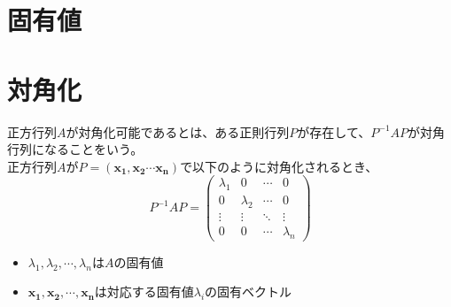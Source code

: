 \documentclass{jlreq}
\begin{document}
\section{固有値}


\section{対角化}
\begin{tcolorbox}[enhanced,title=定義1 行列の対角化, 
  attach boxed title to top left, 
  colback=white!95!blue,
  colbacktitle=white!10!blue!50!black,
  drop fuzzy shadow,
  boxrule=0.25mm,
  ]
  正方行列$A$が対角化可能であるとは、ある正則行列$P$が存在して、$P^{-1}AP$が対角行列になることをいう。 \\
  正方行列$A$が$P = (\boldsymbol{x_1}, \boldsymbol{x_2} \cdots \boldsymbol{x_n})$で以下のように対角化されるとき、
  \begin{equation*}
    P^{-1}AP = \begin{pmatrix}
      \lambda_1 & 0 & \cdots & 0 \\
      0 & \lambda_2 & \cdots & 0 \\
      \vdots & \vdots & \ddots & \vdots \\
      0 & 0 & \cdots & \lambda_n
  \end{pmatrix}
  \end{equation*}
  \begin{itemize}
    \item $\lambda_1, \lambda_2, \cdots, \lambda_n$は$A$の固有値
    \item $\boldsymbol{x_1}, \boldsymbol{x_2}, \cdots, \boldsymbol{x_n}$は対応する固有値$\lambda_i$の固有ベクトル
  \end{itemize}
\end{tcolorbox}
\end{document}
